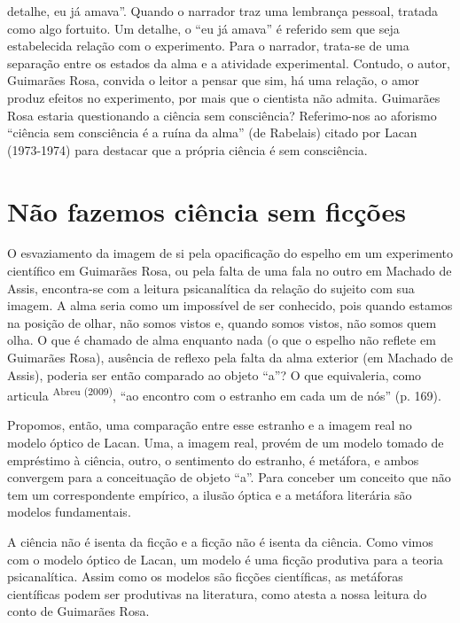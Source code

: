\begin{multicols}{2}
detalhe,\allowbreak{} eu já amava”.\allowbreak{} Quando o narrador traz uma lembrança pessoal,\allowbreak{} tratada como algo fortuito.\allowbreak{} Um detalhe,\allowbreak{} o “eu já amava” é referido sem que seja estabelecida relação com o experimento.\allowbreak{} Para o narrador,\allowbreak{} trata-\allowbreak{}se de uma separação entre os estados da alma e a atividade experimental.\allowbreak{} Contudo,\allowbreak{} o autor,\allowbreak{} Guimarães Rosa,\allowbreak{} convida o leitor a pensar que sim,\allowbreak{} há uma relação,\allowbreak{} o amor produz efeitos no experimento,\allowbreak{} por mais que o cientista não admita.\allowbreak{} Guimarães Rosa estaria questionando a ciência sem consciência? Referimo-\allowbreak{}nos ao aforismo “ciência sem consciência é a ruína da alma” (\allowbreak{}de Rabelais)\allowbreak{} citado por Lacan (\allowbreak{}1973-\allowbreak{}1974)\allowbreak{} para destacar que a própria ciência é sem consciência.\allowbreak{}
\section*{Não fazemos ciência sem ficções}
\par{}O esvaziamento da imagem de si pela opacificação do espelho em um experimento científico em Guimarães Rosa,\allowbreak{} ou pela falta de uma fala no outro em Machado de Assis,\allowbreak{} encontra-\allowbreak{}se com a leitura psicanalítica da relação do sujeito com sua imagem.\allowbreak{} A alma seria como um impossível de ser conhecido,\allowbreak{} pois quando estamos na posição de olhar,\allowbreak{} não somos vistos e,\allowbreak{} quando somos vistos,\allowbreak{} não somos quem olha.\allowbreak{} O que é chamado de alma enquanto nada (\allowbreak{}o que o espelho não reflete em Guimarães Rosa)\allowbreak{},\allowbreak{} ausência de reflexo pela falta da alma exterior (\allowbreak{}em Machado de Assis)\allowbreak{},\allowbreak{} poderia ser então comparado ao objeto “a”? O que equivaleria,\allowbreak{} como articula \textsuperscript{Abreu (\allowbreak{}2009)\allowbreak{}},\allowbreak{} “ao encontro com o estranho em cada um de nós” (\allowbreak{}p.\allowbreak{} 169)\allowbreak{}.\allowbreak{}\par{}Propomos,\allowbreak{} então,\allowbreak{} uma comparação entre esse estranho e a imagem real no modelo óptico de Lacan.\allowbreak{} Uma,\allowbreak{} a imagem real,\allowbreak{} provém de um modelo tomado de empréstimo à ciência,\allowbreak{} outro,\allowbreak{} o sentimento do estranho,\allowbreak{} é metáfora,\allowbreak{} e ambos convergem para a conceituação de objeto “a”.\allowbreak{} Para conceber um conceito que não tem um correspondente empírico,\allowbreak{} a ilusão óptica e a metáfora literária são modelos fundamentais.\allowbreak{}\par{}A ciência não é isenta da ficção e a ficção não é isenta da ciência.\allowbreak{} Como vimos com o modelo óptico de Lacan,\allowbreak{} um modelo é uma ficção produtiva para a teoria psicanalítica.\allowbreak{} Assim como os modelos são ficções científicas,\allowbreak{} as metáforas científicas podem ser produtivas na literatura,\allowbreak{} como atesta a nossa leitura do conto de Guimarães Rosa.\allowbreak{}


\end{multicols}
